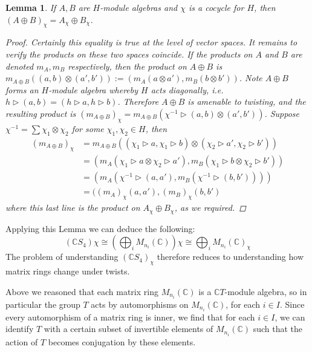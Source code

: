 \documentclass[11pt]{article}
\newcommand{\bb}{\medbreak}
\newcommand{\nt}{\noindent}
\newcommand{\Cc}{\mathbb{C}}
\newtheorem{lemma}{Lemma}[section]
\theoremstyle{definition}
\begin{document}
\begin{lemma} If $A, B$ are $H$-module algebras and $\chi$ is a cocycle for $H$, then $(A\oplus B)_\chi=A_\chi \oplus B_\chi$.
\begin{proof}
Certainly this equality is true at the level of vector spaces. It remains to verify the products on these two spaces coincide. If the products on $A$ and $B$ are denoted $m_A, m_B$ respectively, then the product on $A\oplus B$ is $m_{A\oplus B}((a,b)\otimes (a',b')):=(m_A(a\otimes a'), m_B(b\otimes b'))$. Note $A\oplus B$ forms an $H$-module algebra whereby $H$ acts diagonally, i.e. $h\rhd (a,b)=(h\rhd a, h\rhd b)$. Therefore $A\oplus B$ is amenable to twisting, and the resulting product is $(m_{A\oplus B})_\chi=m_{A\oplus B}(\chi^{-1}\rhd (a,b)\otimes (a',b'))$. Suppose $\chi^{-1}=\sum \chi_1\otimes \chi_2$ for some $\chi_1,\chi_2\in H$, then 
\begin{align*}
  (m_{A\oplus B})_\chi & =m_{A\oplus B}((\chi_1\rhd a, \chi_1\rhd b)\otimes (\chi_2\rhd a', \chi_2\rhd b'))\\
  & =(m_A(\chi_1\rhd a \otimes \chi_2\rhd a'), m_B(\chi_1\rhd b \otimes \chi_2\rhd b'))\\
  & =(m_A(\chi^{-1}\rhd (a,a'),m_B(\chi^{-1}\rhd (b,b'))))\\
  & =((m_A)_\chi(a,a'), (m_B)_\chi(b,b')
\end{align*}
where this last line is the product on $A_\chi\oplus B_\chi$, as we required.
\end{proof}
\end{lemma}
\nt Applying this Lemma we can deduce the following:
\begin{equation}\label{main_isoms_pt_1}(\mathbb{C}S_4)\chi\cong (\bigoplus_{i}M_{n_i}(\mathbb{C}))\chi\cong \bigoplus_i M_{n_i}(\mathbb{C})_\chi
\end{equation}
The problem of understanding $(\Cc S_4)_\chi$ therefore reduces to understanding how matrix rings change under twists.\bb

\nt Above we reasoned that each matrix ring $M_{n_i}(\Cc)$ is a $\Cc T$-module algebra, so in particular the group $T$ acts by automorphisms on $M_{n_i}(\Cc)$, for each $i\in I$. Since every automorphism of a matrix ring is inner, we find that for each $i\in I$, we can identify $T$ with a certain subset of invertible elements of $M_{n_i}(\Cc)$ such that the action of $T$ becomes conjugation by these elements.\bb
\end{document}
